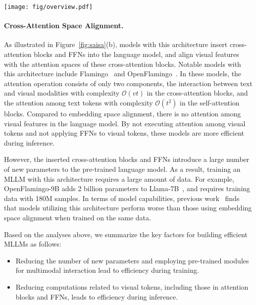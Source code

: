 \begin{figure*}
    \centering
    \texttt{[image: fig/overview.pdf]}
    \vspace{-0.1cm}
    \caption{\textbf{Overview of SAISA and the mainstream architectures to align visual features with language model.} (a) Aligning visual features with the embedding space of the language model is inefficient during inference, e.g. LLaVA series. (b) Aligning visual features with the attention spaces of new cross-attention blocks is inefficient during training, e.g. Flamingo and OpenFlamingo. (c) SAISA aligns visual features with the self-attention input spaces of the language models, achieving efficiency during both training and inference.
    }
  \label{fig:saisa}
\end{figure*}


\vspace{-0.35cm}
\paragraph{Cross-Attention Space Alignment.}
As illustrated in Figure~\ref{fig:saisa}(b), models with this architecture insert cross-attention blocks and FFNs into the language model, and align visual features with the attention spaces of these cross-attention blocks.
Notable models with this architecture include Flamingo~\cite{alayrac2022flamingovisuallanguagemodel} and OpenFlamingo~\cite{awadalla2023openflamingoopensourceframeworktraining}.
In these models, the attention operation consists of only two components, the interaction between text and visual modalities with complexity $\mathcal{O}(vt)$ in the cross-attention blocks, and the attention among text tokens with complexity $\mathcal{O}(t^2)$ in the self-attention blocks.
Compared to embedding space alignment, there is no attention among visual features in the language model.
By not executing attention among visual tokens and not applying FFNs to visual tokens, these models are more efficient during inference.

However, the inserted cross-attention blocks and FFNs introduce a large number of new parameters to the pre-trained language model.
As a result, training an MLLM with this architecture requires a large amount of data.
For example, OpenFlamingo-9B adds 2 billion parameters to Llama-7B~\cite{touvron2023llamaopenefficientfoundation}, and requires training data with 180M samples.
In terms of model capabilities, previous work~\cite{dai2024nvlmopenfrontierclassmultimodal} finds that models utilizing this architecture perform worse than those using embedding space alignment when trained on the same data.

Based on the analyses above, we summarize the key factors for building efficient MLLMs as follows:
\begin{itemize}
    \item Reducing the number of new parameters and employing pre-trained modules for multimodal interaction lead to efficiency during training.
    \item Reducing computations related to visual tokens, including those in attention blocks and FFNs, leads to efficiency during inference.
\end{itemize}
